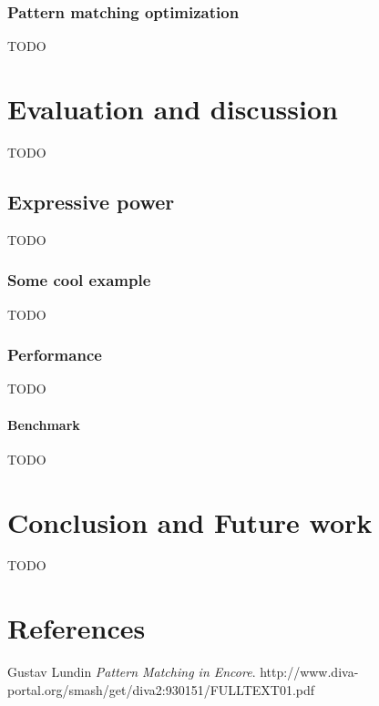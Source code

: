 \documentclass[10pt]{report}
\begin{document}
\subsection{Pattern matching optimization}
TODO

\chapter{Evaluation and discussion}
TODO
\section{Expressive power}
TODO
\subsection{Some cool example}
TODO
\subsection{Performance}
TODO
\subsubsection{Benchmark}
TODO
\chapter{Conclusion and Future work}
TODO

\printbibliography

\chapter{References}


\begin{thebibliography}{9}
Gustav Lundin
\textit{Pattern Matching in Encore}. 
http://www.diva-portal.org/smash/get/diva2:930151/FULLTEXT01.pdf
 
\end{thebibliography}


\begin{appendices}
\end{appendices}
\end{document}
